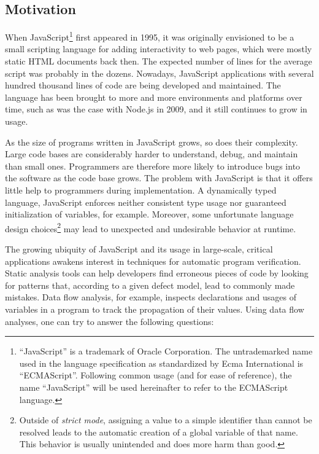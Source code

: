 \subsection{Motivation}
\label{sec:motivation}

When JavaScript\footnote{``JavaScript'' is a trademark of Oracle Corporation. The untrademarked name used in the language specification \cite{es5-spec} as standardized by Ecma International\textsuperscript{\textregistered} is ``ECMAScript''. Following common usage (and for ease of reference), the name ``JavaScript'' will be used hereinafter to refer to the ECMAScript language.} first appeared in 1995, it was originally envisioned to be a small scripting language for adding interactivity to web pages, which were mostly static HTML documents back then. The expected number of lines for the average script was probably in the dozens. Nowadays, JavaScript applications with several hundred thousand lines of code are being developed and maintained. The language has been brought to more and more environments and platforms over time, such as was the case with Node.js \cite{nodejs} in 2009, and it still continues to grow in usage.

As the size of programs written in JavaScript grows, so does their complexity. Large code bases are considerably harder to understand, debug, and maintain than small ones. Programmers are therefore more likely to introduce bugs into the software as the code base grows. The problem with JavaScript is that it offers little help to programmers during implementation. A dynamically typed language, JavaScript enforces neither consistent type usage nor guaranteed initialization of variables, for example. Moreover, some unfortunate language design choices\footnote{Outside of \textit{strict mode}, assigning a value to a simple identifier than cannot be resolved leads to the automatic creation of a global variable of that name. This behavior is usually unintended and does more harm than good.} may lead to unexpected and undesirable behavior at runtime.

The growing ubiquity of JavaScript and its usage in large-scale, critical applications awakens interest in techniques for automatic program verification. Static analysis tools can help developers find erroneous pieces of code by looking for patterns that, according to a given defect model, lead to commonly made mistakes. Data flow analysis, for example, inspects declarations and usages of variables in a program to track the propagation of their values. Using data flow analyses, one can try to answer the following questions:

